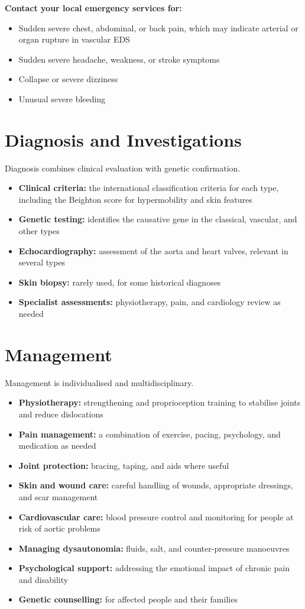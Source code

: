 \textbf{Contact your local emergency services for:}
\begin{itemize}
    \item Sudden severe chest, abdominal, or back pain, which may indicate arterial or organ rupture in vascular EDS
    \item Sudden severe headache, weakness, or stroke symptoms
    \item Collapse or severe dizziness
    \item Unusual severe bleeding
\end{itemize}

\section*{Diagnosis and Investigations}
Diagnosis combines clinical evaluation with genetic confirmation.
\begin{itemize}
    \item \textbf{Clinical criteria:} the international classification criteria for each type, including the Beighton score for hypermobility and skin features
    \item \textbf{Genetic testing:} identifies the causative gene in the classical, vascular, and other types
    \item \textbf{Echocardiography:} assessment of the aorta and heart valves, relevant in several types
    \item \textbf{Skin biopsy:} rarely used, for some historical diagnoses
    \item \textbf{Specialist assessments:} physiotherapy, pain, and cardiology review as needed
\end{itemize}

\section*{Management}
Management is individualised and multidisciplinary.
\begin{itemize}
    \item \textbf{Physiotherapy:} strengthening and proprioception training to stabilise joints and reduce dislocations
    \item \textbf{Pain management:} a combination of exercise, pacing, psychology, and medication as needed
    \item \textbf{Joint protection:} bracing, taping, and aids where useful
    \item \textbf{Skin and wound care:} careful handling of wounds, appropriate dressings, and scar management
    \item \textbf{Cardiovascular care:} blood pressure control and monitoring for people at risk of aortic problems
    \item \textbf{Managing dysautonomia:} fluids, salt, and counter-pressure manoeuvres
    \item \textbf{Psychological support:} addressing the emotional impact of chronic pain and disability
    \item \textbf{Genetic counselling:} for affected people and their families
\end{itemize}

